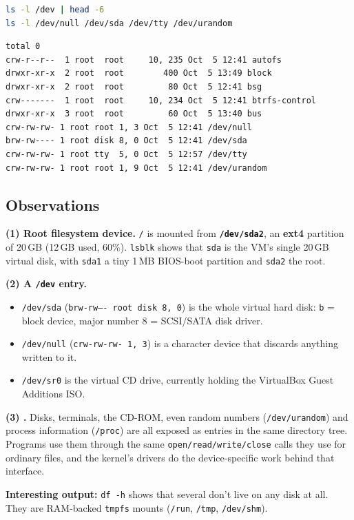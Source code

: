 \documentclass[12pt]{article}
\begin{document}
\begin{lstlisting}[language=bash]
ls -l /dev | head -6
ls -l /dev/null /dev/sda /dev/tty /dev/urandom
\end{lstlisting}
\begin{lstlisting}
total 0
crw-r--r--  1 root  root     10, 235 Oct  5 12:41 autofs
drwxr-xr-x  2 root  root        400 Oct  5 13:49 block
drwxr-xr-x  2 root  root         80 Oct  5 12:41 bsg
crw-------  1 root  root     10, 234 Oct  5 12:41 btrfs-control
drwxr-xr-x  3 root  root         60 Oct  5 13:40 bus
crw-rw-rw- 1 root root 1, 3 Oct  5 12:41 /dev/null
brw-rw---- 1 root disk 8, 0 Oct  5 12:41 /dev/sda
crw-rw-rw- 1 root tty  5, 0 Oct  5 12:57 /dev/tty
crw-rw-rw- 1 root root 1, 9 Oct  5 12:41 /dev/urandom
\end{lstlisting}

\subsection*{Observations}
\textbf{(1) Root filesystem device.} \texttt{/} is mounted from \textbf{\texttt{/dev/sda2}}, an \textbf{ext4} partition of 20\,GB (12\,GB used, 60\%). \texttt{lsblk} shows that \texttt{sda} is the VM's single 20\,GB virtual disk, with \texttt{sda1} a tiny 1\,MB BIOS-boot partition and \texttt{sda2} the root.

\textbf{(2) A \texttt{/dev} entry.}
\begin{itemize}
    \item \texttt{/dev/sda} (\texttt{brw-rw---- root disk 8, 0}) is the whole virtual hard disk: \texttt{b} = block device, major number 8 = SCSI/SATA disk driver.
    \item \texttt{/dev/null} (\texttt{crw-rw-rw- 1, 3}) is a character device that discards anything written to it.
    \item \texttt{/dev/sr0} is the virtual CD drive, currently holding the VirtualBox Guest Additions ISO.
\end{itemize}

\textbf{(3) .} Disks, terminals, the CD-ROM, even random numbers (\texttt{/dev/urandom}) and process information (\texttt{/proc}) are all exposed as entries in the same directory tree. Programs use them through the same \texttt{open/read/write/close} calls they use for ordinary files, and the kernel's drivers do the device-specific work behind that interface.

\textbf{Interesting output:} \texttt{df -h} shows that several  don't live on any disk at all. They are RAM-backed \texttt{tmpfs} mounts (\texttt{/run}, \texttt{/tmp}, \texttt{/dev/shm}).
\end{document}
